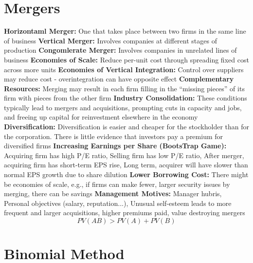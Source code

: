 \documentclass{cheatsheet}
\begin{document}
\section{Mergers}
\textbf{Horizontaml Merger:} One that takes place between two firms
in the same line of business
\textbf{Vertical Merger:} Involves companies at different stages of production
\textbf{Congomlerate Merger:} Involves companies in unrelated lines of business
\textbf{Economies of Scale:} Reduce per-unit cost through spreading fixed cost across more units
\textbf{Economies of Vertical Integration:} Control over suppliers may reduce cost - overintegration can have opposite effect
\textbf{Complementary Resources:} Merging may result in each firm filling in the “missing pieces” of its firm with pieces from the other firm
\textbf{Industry Consolidation:} These conditions typically lead to mergers and acquisitions, prompting cuts in capacity and jobs, and freeing up capital for reinvestment elsewhere in the economy
\textbf{Diversification:} Diversification is easier and cheaper for the stockholder than for the corporation. There is little evidence that investors pay a premium for diversified firms
\textbf{Increasing Earnings per Share (BootsTrap Game):} Acquiring firm has high P/E ratio, Selling firm has low P/E ratio, After merger, acquiring firm has short-term EPS rise, Long term, acquirer will have slower than normal EPS growth due to share dilution 
\textbf{Lower Borrowing Cost:} There might be economies of scale, e.g., if firms can make fewer, larger security issues by merging, there can be savings
\textbf{Management Motives:} Manager hubris, Personal objectives (salary, reputation...), Unusual self-esteem leads to more frequent and larger acquisitions, higher premiums paid, value destroying mergers
\[PV(AB) > PV(A) + PV(B)\]

\section*{Binomial Method}
\end{document}
